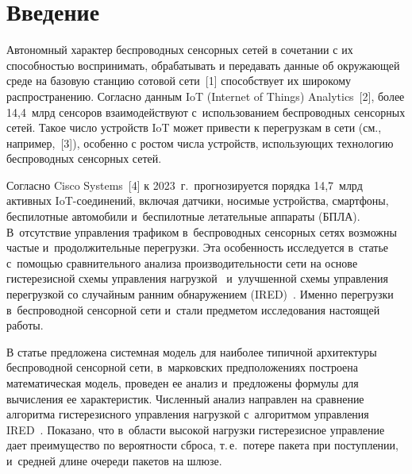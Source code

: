   
\vspace*{-3pt}



\thispagestyle{headings}

\begin{multicols}{2}

\label{st\stat}
  
\section{Введение}

  Автономный характер беспроводных сенсорных сетей  в сочетании с их способностью 
воспринимать, обрабатывать и передавать данные об окружающей среде на базовую 
станцию сотовой сети~[1] способствует их широкому распространению. Согласно 
данным IoT (Internet of Things) Analytics~[2], более 14,4~млрд сенсоров взаимодействуют 
с~использованием беспроводных сенсорных сетей. Такое число устройств IoT может 
привести к перегрузкам в сети (см., например,~[3]), особенно с ростом числа устройств, 
использующих технологию беспроводных сенсорных сетей.
  
  Согласно Cisco Systems~[4] к 2023~г.\ прогнозируется порядка 14,7~млрд 
активных IoT-со\-еди\-не\-ний, включая датчики, носимые устройства, смартфоны, 
беспилотные автомобили и~беспилотные летательные аппараты (БПЛА). В~отсутствие 
управ\-ле\-ния трафиком в~беспроводных сенсорных сетях возможны частые 
и~продолжительные перегрузки. Эта особенность исследуется в~\mbox{статье} с~по\-мощью 
сравнительного анализа про\-из\-во\-ди\-тель\-ности сети на основе гистерезисной схемы 
управления нагрузкой~\cite{6-al, 7-al} и~улучшенной схемы управ\-ле\-ния перегрузкой со 
случайным ранним обнаружением (IRED)~\cite{5-al}. Именно перегрузки в~беспроводной 
сенсорной сети и~стали предметом исследования настоящей работы.
  
  В статье предложена системная модель для наиболее типичной архитектуры 
беспроводной сенсорной сети, в~марковских предположениях по\-стро\-ена математическая 
модель, проведен ее анализ и~предложены формулы для вычисления ее характеристик. 
Численный анализ направлен на сравнение алгоритма гистерезисного управ\-ле\-ния 
нагрузкой с~алгоритмом управ\-ле\-ния IRED~\cite{5-al}. Показано, что в~об\-ласти высокой 
нагрузки гистерезисное управ\-ле\-ние дает преимущество по вероятности сброса, т.\,е.\ 
потере пакета при поступлении, и~средней длине очереди пакетов на шлюзе.


\end{multicols}
